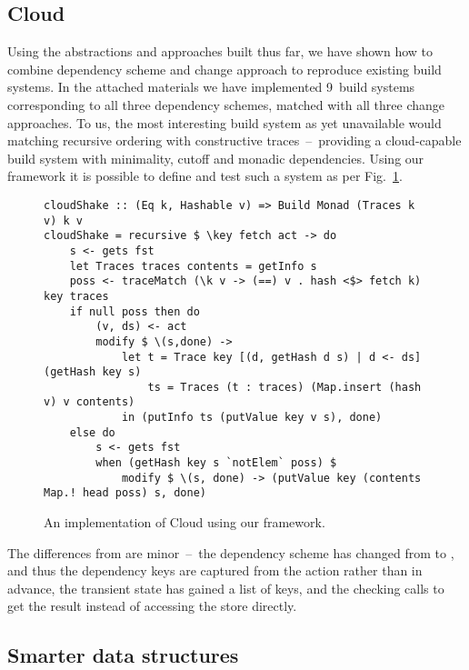 \subsection{Cloud \Shake}\label{sec-implementation-cloud-shake}

Using the abstractions and approaches built thus far, we have shown how to combine dependency scheme and change approach to reproduce existing build systems. In the attached materials we have implemented 9~build systems corresponding to all three dependency schemes, matched with all three change approaches. To us, the most interesting build system as yet unavailable would matching recursive ordering with constructive traces~--~providing a cloud-capable build system with minimality, cutoff and monadic dependencies. Using our framework it is possible to define and test such a system as per Fig.~\ref{fig-cloudshake-implementation}.

\begin{figure}
\begin{verbatim}
cloudShake :: (Eq k, Hashable v) => Build Monad (Traces k v) k v
cloudShake = recursive $ \key fetch act -> do
    s <- gets fst
    let Traces traces contents = getInfo s
    poss <- traceMatch (\k v -> (==) v . hash <$> fetch k) key traces
    if null poss then do
        (v, ds) <- act
        modify $ \(s,done) ->
            let t = Trace key [(d, getHash d s) | d <- ds] (getHash key s)
                ts = Traces (t : traces) (Map.insert (hash v) v contents)
            in (putInfo ts (putValue key v s), done)
    else do
        s <- gets fst
        when (getHash key s `notElem` poss) $
            modify $ \(s, done) -> (putValue key (contents Map.! head poss) s, done)
\end{verbatim}
\vspace{-2mm}
\caption{An implementation of Cloud \Shake using our framework.}\label{fig-cloudshake-implementation}
\vspace{-4mm}
\end{figure}

The differences from  are minor~--~the dependency scheme has changed
from  to , and thus the dependency keys 
are captured from the action rather than in advance, the transient state has
gained a list of keys, and the checking calls  to get the result
instead of accessing the store directly.

\vspace{-1mm}
\subsection{Smarter \hs{[Trace]} data structures}\label{sec-smart-traces}
\vspace{-1mm}

